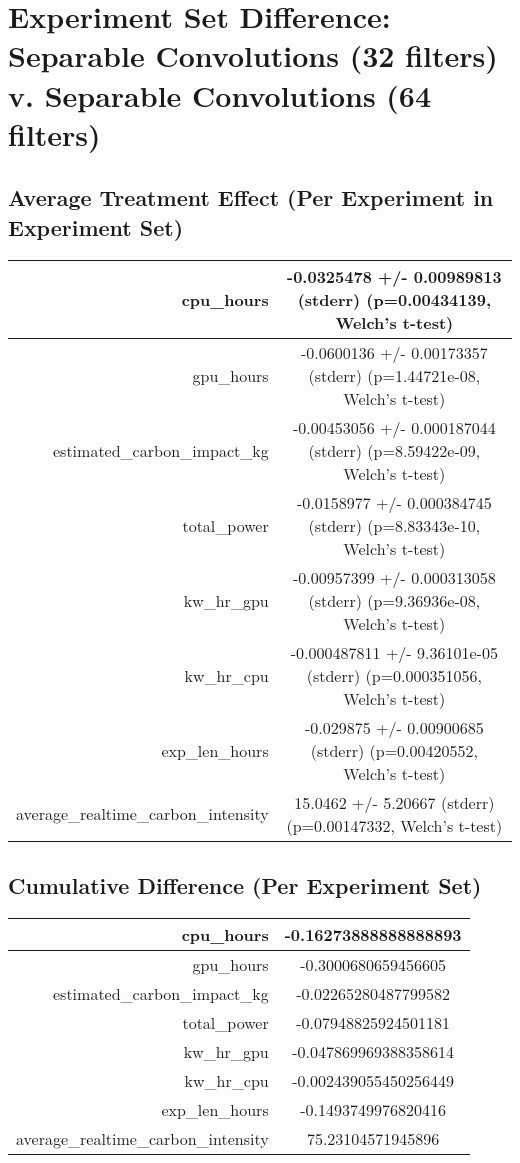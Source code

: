 \documentclass{article}%
\begin{document}
%
\normalsize%
\section{Experiment Set Difference: Separable Convolutions (32 filters) v. Separable Convolutions (64 filters)}%
\label{sec:Experiment Set Difference Separable Convolutions (32 filters) v. Separable Convolutions (64 filters)}%
\subsection{Average Treatment Effect (Per Experiment in Experiment Set)}%
\label{subsec:Average Treatment Effect (Per Experiment in Experiment Set)}%
\begin{tabular}{|r|c|}%
\hline%
cpu\_hours&{-}0.0325478 +/{-} 0.00989813 (stderr) (p=0.00434139, Welch's t{-}test)\\%
\hline%
gpu\_hours&{-}0.0600136 +/{-} 0.00173357 (stderr) (p=1.44721e{-}08, Welch's t{-}test)\\%
\hline%
estimated\_carbon\_impact\_kg&{-}0.00453056 +/{-} 0.000187044 (stderr) (p=8.59422e{-}09, Welch's t{-}test)\\%
\hline%
total\_power&{-}0.0158977 +/{-} 0.000384745 (stderr) (p=8.83343e{-}10, Welch's t{-}test)\\%
\hline%
kw\_hr\_gpu&{-}0.00957399 +/{-} 0.000313058 (stderr) (p=9.36936e{-}08, Welch's t{-}test)\\%
\hline%
kw\_hr\_cpu&{-}0.000487811 +/{-} 9.36101e{-}05 (stderr) (p=0.000351056, Welch's t{-}test)\\%
\hline%
exp\_len\_hours&{-}0.029875 +/{-} 0.00900685 (stderr) (p=0.00420552, Welch's t{-}test)\\%
\hline%
average\_realtime\_carbon\_intensity&15.0462 +/{-} 5.20667 (stderr) (p=0.00147332, Welch's t{-}test)\\%
\hline%
\end{tabular}

%
\subsection{Cumulative Difference (Per Experiment Set)}%
\label{subsec:Cumulative Difference (Per Experiment Set)}%
\begin{tabular}{|r|c|}%
\hline%
cpu\_hours&{-}0.16273888888888893\\%
\hline%
gpu\_hours&{-}0.3000680659456605\\%
\hline%
estimated\_carbon\_impact\_kg&{-}0.02265280487799582\\%
\hline%
total\_power&{-}0.07948825924501181\\%
\hline%
kw\_hr\_gpu&{-}0.047869969388358614\\%
\hline%
kw\_hr\_cpu&{-}0.002439055450256449\\%
\hline%
exp\_len\_hours&{-}0.1493749976820416\\%
\hline%
average\_realtime\_carbon\_intensity&75.23104571945896\\%
\hline%
\end{tabular}

%
\end{document}
